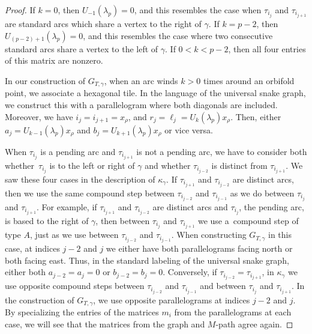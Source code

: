\documentclass[pdftex]{sigma}%
\numberwithin{equation}{section}
\begin{document}
\begin{proof}
If $k = 0$, then $U_{-1}(\lambda_p) = 0$, and this resembles the case when $\tau_{i_j}$ and $\tau_{i_{j+1}}$ are standard arcs which share a vertex to the right of $\gamma$. If $k = p-2$, then $U_{(p-2)+1}(\lambda_p) = 0$, and this resembles the case where two consecutive standard arcs share a vertex to the left of $\gamma$. If $0 < k < p-2$, then all four entries of this matrix are nonzero.

In our construction of $G_{T,\gamma}$, when an arc winds $k > 0$ times around an orbifold point, we associate a hexagonal tile. In the language of the universal snake graph, we construct this with a parallelogram where both diagonals are included. Moreover, we have $i_j = i_{j+1} = x_\rho$, and $r_j = \ell_j = U_k(\lambda_p) x_\rho$. Then, either $a_j = U_{k-1}(\lambda_p) x_\rho$ and $b_j = U_{k+1}(\lambda_p) x_\rho$ or vice versa.

When $\tau_{i_j}$ is a pending arc and $\tau_{i_{j+1}}$ is not a pending arc, we have to consider both whether~$\tau_{i_j}$ is to the left or right of $\gamma$ and whether $\tau_{i_{j-2}}$ is distinct from $\tau_{i_{j+1}}$. We saw these four cases in the description of $\kappa_\gamma$. If $\tau_{i_{j+1}}$ and $\tau_{i_{j-2}}$ are distinct arcs, then we use the same compound step between $\tau_{i_{j-2}}$ and $\tau_{i_{j-1}}$ as we do between $\tau_{i_{j}}$ and $\tau_{i_{j+1}}$. For example, if $\tau_{i_{j+1}}$ and $\tau_{i_{j-2}}$ are distinct arcs and $\tau_{i_j}$, the pending arc, is based to the right of $\gamma$, then between $\tau_{i_j}$ and $\tau_{i_{j+1}}$ we use a~compound step of type $A$, just as we use between $\tau_{i_{j-2}}$ and $\tau_{i_{j-1}}$. When constructing $G_{T,\gamma}$ in this case, at indices $j-2$ and $j$ we either have both parallelograms facing north or both facing east. Thus, in the standard labeling of the universal snake graph, either both $a_{j-2} = a_j = 0$ or $b_{j-2} = b_j = 0$. Conversely, if $\tau_{i_{j-2}} = \tau_{i_{j+1}}$, in $\kappa_\gamma$ we use opposite compound steps between $\tau_{i_{j-2}}$ and $\tau_{i_{j-1}}$ and between $\tau_{i_{j}}$ and $\tau_{i_{j+1}}$. In the construction of $G_{T,\gamma}$, we use opposite parallelograms at indices $j-2$ and $j$. By specializing the entries of the matrices $m_i$ from the parallelograms at each case, we will see that the matrices from the graph and $M$-path agree again.


\end{proof}
\end{document}
